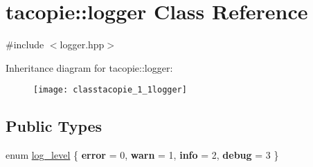 \hypertarget{classtacopie_1_1logger}{}\section{tacopie\+:\+:logger Class Reference}
\label{classtacopie_1_1logger}


{\ttfamily \#include $<$logger.\+hpp$>$}

Inheritance diagram for tacopie\+:\+:logger\+:\begin{figure}[H]
\begin{center}
\leavevmode
\texttt{[image: classtacopie\_1\_1logger]}
\end{center}
\end{figure}
\subsection*{Public Types}
\begin{DoxyCompactItemize}
\item 
enum \hyperlink{classtacopie_1_1logger_ae7dd235972bbf86a017fc39b3af80efe}{log\+\_\+level} \{ {\bfseries error} = 0, 
{\bfseries warn} = 1, 
{\bfseries info} = 2, 
{\bfseries debug} = 3
 \}
\end{DoxyCompactItemize}
